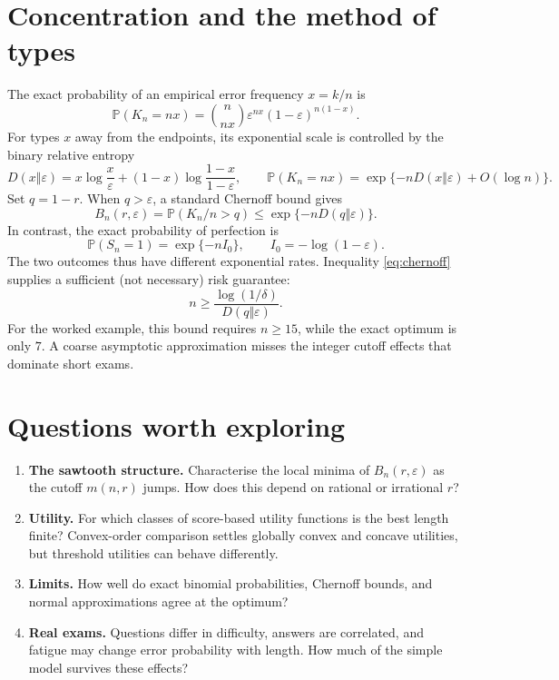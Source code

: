 \documentclass[11pt,a4paper]{article}
\newcommand{\Prb}{\mathbb P}
\begin{document}
\section{Concentration and the method of types}
The exact probability of an empirical error frequency $x=k/n$ is
\begin{equation}
 \Prb(K_n=nx)={n\choose nx}\varepsilon^{nx}(1-\varepsilon)^{n(1-x)}.
\end{equation}
For types $x$ away from the endpoints, its exponential scale is controlled by the binary relative entropy
\begin{equation}
 D(x\Vert\varepsilon)=x\log\frac{x}{\varepsilon}+(1-x)\log\frac{1-x}{1-\varepsilon},
 \qquad
 \Prb(K_n=nx)=\exp\{-nD(x\Vert\varepsilon)+O(\log n)\}.
\end{equation}
Set $q=1-r$. When $q>\varepsilon$, a standard Chernoff bound gives
\begin{equation}
 B_n(r,\varepsilon)=\Prb(K_n/n>q)
 \leq \exp\{-nD(q\Vert\varepsilon)\}.
 \label{eq:chernoff}
\end{equation}
In contrast, the exact probability of perfection is
\begin{equation}
 \Prb(S_n=1)=\exp\{-nI_0\},\qquad I_0=-\log(1-\varepsilon).
\end{equation}
The two outcomes thus have different exponential rates. Inequality \eqref{eq:chernoff} supplies a sufficient (not necessary) risk guarantee:
\begin{equation}
 n\geq\frac{\log(1/\delta)}{D(q\Vert\varepsilon)}.
\end{equation}
For the worked example, this bound requires $n\geq15$, while the exact optimum is only $7$. A coarse asymptotic approximation misses the integer cutoff effects that dominate short exams.

\section{Questions worth exploring}
\begin{enumerate}
\item \textbf{The sawtooth structure.} Characterise the local minima of $B_n(r,\varepsilon)$ as the cutoff $m(n,r)$ jumps. How does this depend on rational or irrational $r$?
\item \textbf{Utility.} For which classes of score-based utility functions is the best length finite? Convex-order comparison settles globally convex and concave utilities, but threshold utilities can behave differently.
\item \textbf{Limits.} How well do exact binomial probabilities, Chernoff bounds, and normal approximations agree at the optimum?
\item \textbf{Real exams.} Questions differ in difficulty, answers are correlated, and fatigue may change error probability with length. How much of the simple model survives these effects?
\end{enumerate}
\end{document}
